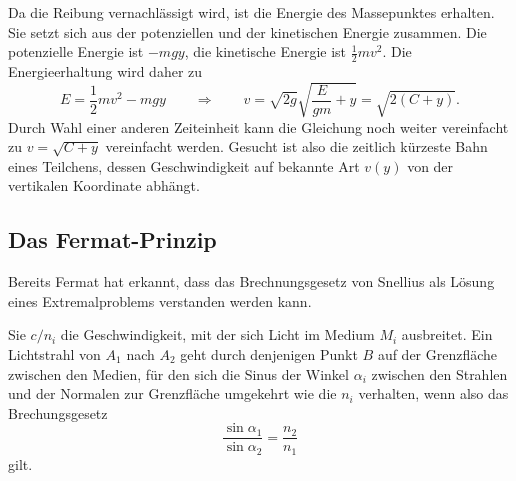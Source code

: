 Da die Reibung vernachlässigt wird, ist die Energie des Massepunktes
erhalten.
Sie setzt sich aus der potenziellen und der kinetischen Energie
zusammen.
Die potenzielle Energie ist $-mgy$, die kinetische Energie ist
$\frac12mv^2$.
Die Energieerhaltung wird daher zu
\[
E=\frac12mv^2-mgy
\qquad\Rightarrow\qquad
v
=
\sqrt{2g}\!\sqrt{\frac{E}{gm}+y}
=
\!\sqrt{2(C+y)}.
\]
Durch Wahl einer anderen Zeiteinheit kann die Gleichung noch weiter
vereinfacht zu
\(
v = \sqrt{C+y}
\)
vereinfacht werden.
Gesucht ist also die zeitlich kürzeste Bahn eines Teilchens, 
dessen Geschwindigkeit auf bekannte Art $v(y)$ von der vertikalen
Koordinate abhängt.

%
%
\subsection{Das Fermat-Prinzip}
Bereits Fermat hat erkannt, dass das Brechnungsgesetz von Snellius
als Lösung eines Extremalproblems verstanden werden kann.

\begin{satz}[Fermat]
Sie $c/n_i$ die Geschwindigkeit, mit der sich Licht im Medium $M_i$
ausbreitet.
Ein Lichtstrahl von $A_1$ nach $A_2$ geht durch denjenigen Punkt $B$ 
auf der Grenzfläche zwischen den Medien, für den sich die Sinus der
Winkel $\alpha_i$ zwischen den Strahlen und der Normalen zur Grenzfläche
umgekehrt wie die $n_i$ verhalten, wenn also das Brechungsgesetz
\[
\frac{\sin\alpha_1}{\sin\alpha_2}
=
\frac{n_2}{n_1}
\]
gilt.
\end{satz}

